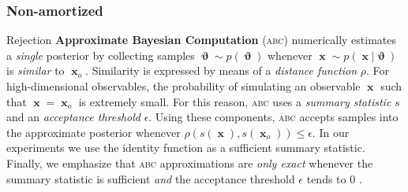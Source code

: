 \documentclass[twoside]{article}
\newcommand{\antoine}[1]{\textcolor{green}{AW: #1}}
\newcommand{\joeri}[1]{\textcolor{red}{JH: #1}}
\DeclareMathOperator*{\argmax}{arg\,max}
\DeclareMathOperator*{\argmin}{arg\,min}
\DeclareMathOperator{\sigmoid}{\sigma}
\DeclareMathOperator{\vtheta}{\boldsymbol\vartheta}
\DeclareMathOperator{\vx}{\boldsymbol x}
\begin{document}
\subsubsection{Non-amortized}
Rejection {\bf Approximate Bayesian Computation} \textsc{(abc)} \citep{rubin1984,pritchard1999population}
numerically estimates a \emph{single} posterior by collecting samples $\vtheta\sim p(\vtheta)$ whenever
$\vx\sim p(\vx\vert\vtheta)$ is \emph{similar} to $\vx_o$. Similarity is expressed by means of a \emph{distance function} $\rho$. For high-dimensional observables, the probability of simulating an observable $\vx$ such that $\vx = \vx_o$ is extremely small. For this reason, \textsc{abc} uses a \emph{summary statistic} $s$ and an \emph{acceptance threshold} $\epsilon$. Using these components, \textsc{abc} accepts samples into the approximate posterior whenever $\rho(s(\vx),s(\vx_o))\leq\epsilon$. In our experiments we use the identity function as a sufficient summary statistic. Finally, we emphasize that 
\textsc{abc} approximations are \emph{only exact} whenever the summary statistic is sufficient \emph{and} the acceptance threshold $\epsilon$ tends to 0 \citep{sisson2018overview}.
\end{document}
